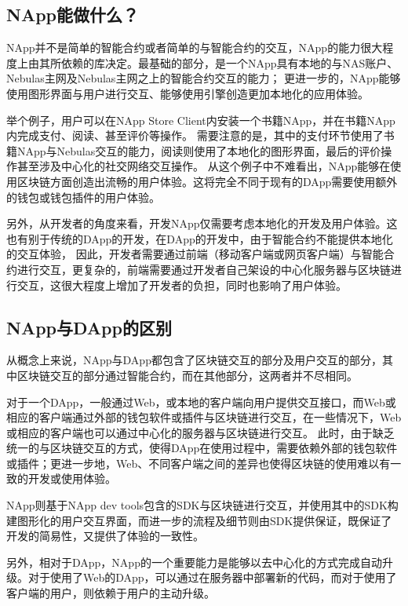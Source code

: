 \subsection{NApp能做什么？}
NApp并不是简单的智能合约或者简单的与智能合约的交互，NApp的能力很大程度上由其所依赖的库决定。最基础的部分，是一个NApp具有本地的与NAS账户、Nebulas主网及Nebulas主网之上的智能合约交互的能力；
更进一步的，NApp能够使用图形界面与用户进行交互、能够使用引擎创造更加本地化的应用体验。

举个例子，用户可以在NApp Store Client内安装一个书籍NApp，并在书籍NApp内完成支付、阅读、甚至评价等操作。
需要注意的是，其中的支付环节使用了书籍NApp与Nebulas交互的能力，阅读则使用了本地化的图形界面，最后的评价操作甚至涉及中心化的社交网络交互操作。
从这个例子中不难看出，NApp能够在使用区块链方面创造出流畅的用户体验。这将完全不同于现有的DApp需要使用额外的钱包或钱包插件的用户体验。

另外，从开发者的角度来看，开发NApp仅需要考虑本地化的开发及用户体验。这也有别于传统的DApp的开发，在DApp的开发中，由于智能合约不能提供本地化的交互体验，
因此，开发者需要通过前端（移动客户端或网页客户端）与智能合约进行交互，更复杂的，前端需要通过开发者自己架设的中心化服务器与区块链进行交互，这很大程度上增加了开发者的负担，同时也影响了用户体验。

\subsection{NApp与DApp的区别}
从概念上来说，NApp与DApp都包含了区块链交互的部分及用户交互的部分，其中区块链交互的部分通过智能合约，而在其他部分，这两者并不尽相同。

对于一个DApp，一般通过Web，或本地的客户端向用户提供交互接口，而Web或相应的客户端通过外部的钱包软件或插件与区块链进行交互，在一些情况下，Web或相应的客户端也可以通过中心化的服务器与区块链进行交互。
此时，由于缺乏统一的与区块链交互的方式，使得DApp在使用过程中，需要依赖外部的钱包软件或插件；更进一步地，Web、不同客户端之间的差异也使得区块链的使用难以有一致的开发或使用体验。

NApp则基于NApp dev tools包含的SDK与区块链进行交互，并使用其中的SDK构建图形化的用户交互界面，而进一步的流程及细节则由SDK提供保证，既保证了开发的简易性，又提供了体验的一致性。

另外，相对于DApp，NApp的一个重要能力是能够以去中心化的方式完成自动升级。对于使用了Web的DApp，可以通过在服务器中部署新的代码，而对于使用了客户端的用户，则依赖于用户的主动升级。